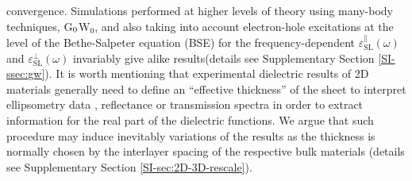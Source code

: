 \documentclass[journal=ancac3,manuscript=article,email=true,hyperref=true,keywords=false]{achemso}
\begin{document}
convergence.
%
Simulations performed at higher levels of theory using many-body
techniques, G$_{\rm 0}$W$_{0}$, and also taking into account
electron-hole excitations at the level of the Bethe-Salpeter equation
(BSE) for the frequency-dependent
$\varepsilon^{\parallel}_{\mathrm{SL}}(\omega)$ and
$\varepsilon^{\perp}_{\mathrm{SL}}(\omega)$ invariably give alike
results(details see Supplementary Section \ref{SI-ssec:gw}).
%
%
%
%
%
%
%
It is worth mentioning that experimental dielectric results of 2D
materials generally need to define an ``effective thickness'' of the sheet
to interpret ellipsometry data
\cite{graphene-epsilon10,Duesberg14,Chiang13,Kong14}, reflectance or
transmission spectra \cite{Li_2014, Yoffe-Wilson69} in order to
extract information for the real part of the dielectric functions.  We
argue that such procedure may induce inevitably variations of the
results as the thickness is normally chosen by the interlayer spacing
of the respective bulk materials (details see Supplementary Section
\ref{SI-sec:2D-3D-rescale}).
%
%
%
%
%
\end{document}
